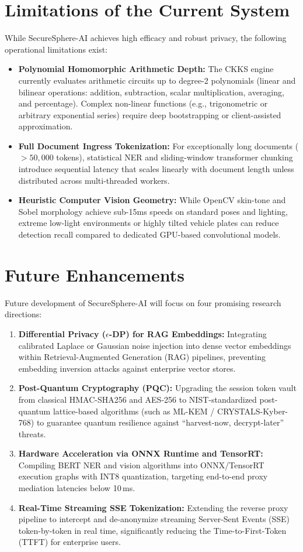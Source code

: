 \section{Limitations of the Current System}
While SecureSphere-AI achieves high efficacy and robust privacy, the following operational limitations exist:
\begin{itemize}[leftmargin=*]
    \item \textbf{Polynomial Homomorphic Arithmetic Depth:} The CKKS engine currently evaluates arithmetic circuits up to degree-2 polynomials (linear and bilinear operations: addition, subtraction, scalar multiplication, averaging, and percentage). Complex non-linear functions (e.g., trigonometric or arbitrary exponential series) require deep bootstrapping or client-assisted approximation.
    \item \textbf{Full Document Ingress Tokenization:} For exceptionally long documents ($>50,000$ tokens), statistical NER and sliding-window transformer chunking introduce sequential latency that scales linearly with document length unless distributed across multi-threaded workers.
    \item \textbf{Heuristic Computer Vision Geometry:} While OpenCV skin-tone and Sobel morphology achieve sub-15ms speeds on standard poses and lighting, extreme low-light environments or highly tilted vehicle plates can reduce detection recall compared to dedicated GPU-based convolutional models.
\end{itemize}

\section{Future Enhancements}
Future development of SecureSphere-AI will focus on four promising research directions:
\begin{enumerate}[leftmargin=*]
    \item \textbf{Differential Privacy ($\epsilon$-DP) for RAG Embeddings:} Integrating calibrated Laplace or Gaussian noise injection into dense vector embeddings within Retrieval-Augmented Generation (RAG) pipelines, preventing embedding inversion attacks against enterprise vector stores.
    \item \textbf{Post-Quantum Cryptography (PQC):} Upgrading the session token vault from classical HMAC-SHA256 and AES-256 to NIST-standardized post-quantum lattice-based algorithms (such as ML-KEM / CRYSTALS-Kyber-768) to guarantee quantum resilience against ``harvest-now, decrypt-later'' threats.
    \item \textbf{Hardware Acceleration via ONNX Runtime and TensorRT:} Compiling BERT NER and vision algorithms into ONNX/TensorRT execution graphs with INT8 quantization, targeting end-to-end proxy mediation latencies below 10\,ms.
    \item \textbf{Real-Time Streaming SSE Tokenization:} Extending the reverse proxy pipeline to intercept and de-anonymize streaming Server-Sent Events (SSE) token-by-token in real time, significantly reducing the Time-to-First-Token (TTFT) for enterprise users.
\end{enumerate}
